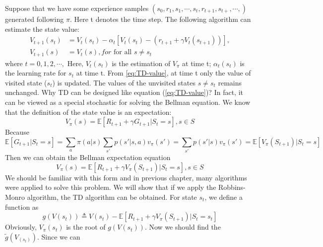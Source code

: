     Suppose that we have some experience samples $(s_{0},r_{1},s_{1},\cdots,s_{t},r_{t+1},s_{t+},\cdots,)$ generated following $\pi$. Here t denotes the time
    step. The following algorithm can estimate the state value:
    \begin{align}
      \label{eq:TD-value}
      V_{t+1}(s_{t}) & = V_{t}(s_{t}) - \alpha_{t}\left[V_{t}(s_{t})-\left(r_{t+1}+\gamma V_{t}(s_{t+1})\right)\right], \\
      V_{t+1}(s)     & = V_{t}(s), for \text{ for all } s\neq s_{t}
    \end{align}
    where $t=0,1,2,\cdots,$ Here, $V_{t}(s_{t})$ is the estimation of $V_{\pi}$ at time t; $\alpha_{t}(s_{t})$ is the learning rate for $s_{t}$ at time t. From
    \ref{eq:TD-value}, at time t only the value of visited state ($s_{t}$) is updated. The values of the unvisited states $s\neq s_{t}$ remains unchanged. Why
    TD can be designed like equation (\ref{eq:TD-value})? In fact, it can be viewed as a special stochastic for solving the Bellman equation. We know that the
    definition of the state value is an expectation:
    \begin{equation*}
      V_{\pi}(s) = \mathbb{E}\left[R_{t+1}+\gamma G_{t+1}|S_{t}=s\right], s\in S
    \end{equation*}
    Because
    \begin{equation*}
      \mathbb{E}\left[G_{t+1}|S_{t}=s\right] = \sum_{a} \pi(a|s)\sum_{s'}p(s'|s,a)v_{\pi}(s') = \sum_{s'}p(s'|s)v_{\pi}(s') =
      \mathbb{E}[V_{\pi}(S_{t+1})|S_{t}=s]
    \end{equation*}
    Then we can obtain the Bellman expectation equation
    \begin{equation}
      \label{eq:Bellman-expectation}
      V_{\pi}(s) = \mathbb{E}[R_{t+1}+\gamma V_{\pi}(S_{t+1})|S_{t}=s], s\in S
    \end{equation}
    We should be familiar with this form and in previous chapter, many algorithms were applied to solve this problem. We will show that if we apply the
    Robbins-Monro algorithm, the TD algorithm can be obtained. For state $s_{t}$, we define a function as
    \begin{equation*}
      g(V(s_{t})) \triangleq V(s_{t}) - \mathbb{E}[R_{t+1}+\gamma V_{\pi}(S_{t+1})|S_{t}=s_{t}]
    \end{equation*}
    Obviously, $V_{\pi}(s_{t})$ is the root of $g(V(s_{t}))$. Now we should find the $\tilde{g}(V_(s_{t}))$. Since we can

